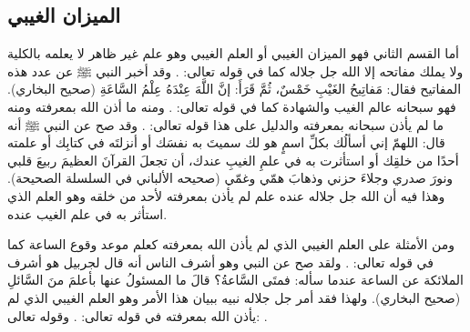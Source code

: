 
\subsection{الميزان الغيبي}

أما القسم الثاني فهو الميزان الغيبي أو العلم الغيبي وهو علم غير ظاهر لا يعلمه بالكلية ولا يملك مفاتحه إلا الله جل جلاله كما في قوله تعالى: 
\quranayah*[6][59]{\footnotesize \surahname*[6]}. وقد أخبر النبي ﷺ عن عدد هذه المفاتيح فقال: مَفاتِيحُ الغَيْبِ خَمْسٌ، ثُمَّ قَرَأَ: {إنَّ اللَّهَ عِنْدَهُ عِلْمُ السَّاعَةِ} {\footnotesize (صحيح البخاري)}. فهو سبحانه  عالم الغيب والشهادة كما في قوله تعالى: 
\quranayah*[59][22]{\footnotesize \surahname*[59]}. ومنه ما أذن الله بمعرفته ومنه ما لم يأذن سبحانه بمعرفته والدليل على هذا قوله تعالى: 
\quranayah*[72][26-27]{\footnotesize \surahname*[72]}. وقد صح عن النبي ﷺ أنه قال: اللهمّ إني أسألُك بكلِّ اسمٍ هو لك سميتَ به نفسَك أو أنزلتَه في كتابِك أو علمته أحدًا من خلقِك أو استأثرت به في علمِ الغيبِ عندك، أن تجعلَ القرآنَ العظيمَ ربيعَ قلبي ونورَ صدري وجلاءَ حزني وذهابَ همّي وغمّي {\footnotesize (صحيحه الألباني في السلسلة الصحيحة)}. وهذا فيه أن الله جل جلاله عنده علم لم يأذن بمعرفته لأحد من خلقه وهو العلم الذي استأثر به في علم الغيب عنده.

ومن الأمثلة على العلم الغيبي الذي لم يأذن الله بمعرفته كعلم موعد وقوع الساعة كما في قوله تعالى: 
\quranayah*[33][63]{\footnotesize \surahname*[33]}.
ولقد صح عن النبي وهو أشرف الناس أنه قال لجربيل هو أشرف الملائكة عن الساعة عندما سأله: فمتَى السَّاعةُ؟ قالَ ما المسئولُ عنها بأعلمَ منَ السَّائلِ {\footnotesize (صحيح البخاري)}. ولهذا فقد أمر جل جلاله نبيه ببيان هذا الأمر وهو العلم الغيبي الذي لم يأذن الله بمعرفته في قوله تعالى:
\quranayah*[6][50]{\footnotesize \surahname*[6]}. وقوله تعالى:
\quranayah*[7][188]{\footnotesize \surahname*[7]}.

